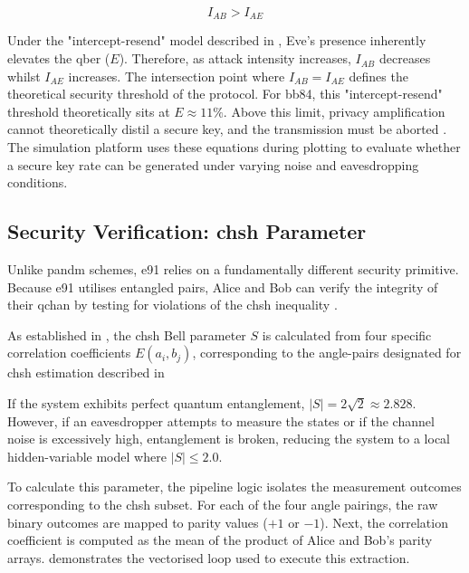 \begin{equation}
I_{AB} > I_{AE}
\label{eq:secure_condition}
\end{equation}

Under the "intercept-resend" model described in , Eve's presence inherently elevates the \gls{qber} ($E$). Therefore, as attack intensity increases, $I_{AB}$ decreases whilst $I_{AE}$ increases. The intersection point where $I_{AB} = I_{AE}$ defines the theoretical security threshold of the protocol. For \gls{bb84}, this "intercept-resend" threshold theoretically sits at $E \approx 11\%$. Above this limit, privacy amplification cannot theoretically distil a secure key, and the transmission must be aborted \cite{ShorPreskill2000}. The simulation platform uses these equations during plotting to evaluate whether a secure key rate can be generated under varying noise and eavesdropping conditions.

\subsection{Security Verification: \gls{chsh} Parameter}
\label{subsec:CHSH}

Unlike \gls{pandm} schemes, \gls{e91} relies on a fundamentally different security primitive. Because \gls{e91} utilises entangled pairs, Alice and Bob can verify the integrity of their \gls{qchan} by testing for violations of the \gls{chsh} inequality \cite{CHSH1969}.  
 
As established in , the \gls{chsh} Bell parameter $S$ is calculated from four specific correlation coefficients $E(a_i, b_j)$, corresponding to the angle-pairs designated for \gls{chsh} estimation described in  

If the system exhibits perfect quantum entanglement, $|S| = 2\sqrt{2} \approx 2.828$. However, if an eavesdropper attempts to measure the states or if the channel noise is excessively high, entanglement is broken, reducing the system to a local hidden-variable model where $|S| \leq 2.0$.

To calculate this parameter, the pipeline logic isolates the measurement outcomes corresponding to the \gls{chsh} subset. For each of the four angle pairings, the raw binary outcomes are mapped to parity values ($+1$ or $-1$). Next, the correlation coefficient is computed as the mean of the product of Alice and Bob's parity arrays.  demonstrates the vectorised loop used to execute this extraction.

